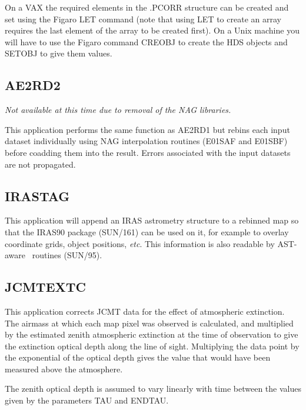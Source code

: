 \documentclass[twoside,11pt]{article}
\newcommand{\xref}[3]{#1}
\newcommand{\xlabel}[1]{}
\renewcommand{\_}{\texttt{\symbol{95}}}
\newcommand{\Kappa}{\xref{{\sc{Kappa}}}{sun95}{}}
\begin{document}
On a VAX the required elements in the .PCORR structure can be created and
set using the Figaro LET command (note that using LET to create an array
requires the last element of the array to be created first). On a Unix machine
you will have to use the Figaro command CREOBJ to create the HDS objects and
SETOBJ to give them values.


\goodbreak

\subsection{\xlabel{AE2RD2}AE2RD2}

\textit{Not available at this time due to removal of the NAG libraries.}

This application performs the same function as AE2RD1 but rebins each
input dataset individually using NAG interpolation routines (E01SAF
and E01SBF) before coadding them into the result. Errors associated
with the input datasets are not propagated.


\goodbreak

\subsection{\xlabel{IRAS_TAG}IRAS\_TAG}

This application will append an IRAS astrometry structure to a
rebinned map so that the IRAS90 package
(\xref{SUN/161}{sun161}{}) can be used on it,
for example to overlay coordinate grids, object positions, {\em etc}.
This information is also readable by AST-aware \Kappa\ routines (\xref{SUN/95}{sun95}{}).

\goodbreak

\subsection{\xlabel{JCMTEXTC}JCMTEXTC}

This application corrects JCMT data for the effect of  atmospheric
extinction. The airmass at which each map pixel was  observed is
calculated, and multiplied by the estimated zenith  atmospheric
extinction at the time of observation to give the  extinction optical
depth along the line of sight. Multiplying the data point by the
exponential of the optical depth gives  the value that would have been
measured above the atmosphere.

The zenith optical depth is assumed to vary linearly with  time
between the values given by the parameters TAU and ENDTAU.
\end{document}
